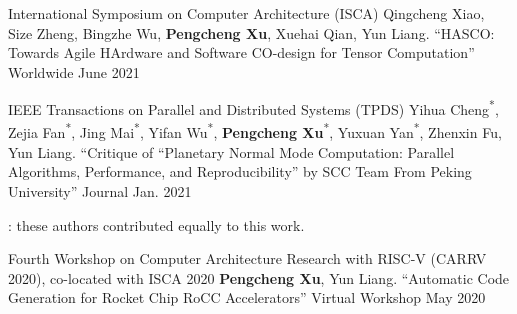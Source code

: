 


\begin{cventries}

  \cventry
    {International Symposium on Computer Architecture (ISCA)}
    {{\normalfont Qingcheng Xiao, Size Zheng, Bingzhe Wu, \textbf{Pengcheng Xu}, Xuehai Qian, Yun Liang. ``HASCO: Towards Agile HArdware and Software CO-design for Tensor Computation''}}
    {Worldwide} %
    {June 2021} %
    {}

  \cventry
    {IEEE Transactions on Parallel and Distributed Systems (TPDS)}
    {{\normalfont Yihua Cheng\textsuperscript{*}, Zejia Fan\textsuperscript{*}, Jing Mai\textsuperscript{*}, Yifan Wu\textsuperscript{*}, \textbf{Pengcheng Xu}\textsuperscript{*}, Yuxuan Yan\textsuperscript{*}, Zhenxin Fu, Yun Liang. ``Critique of “Planetary Normal Mode Computation: Parallel Algorithms, Performance, and Reproducibility” by SCC Team From Peking University''}}
    {Journal} %
    {Jan. 2021} %
    {
      \begin{cvitems} %
      \item {\footnotesize *: these authors contributed equally to this work.}
      \end{cvitems}
    }

  \cventry
    {Fourth Workshop on Computer Architecture Research with RISC-V (CARRV 2020), co-located with ISCA 2020} %
    {{\normalfont \textbf{Pengcheng Xu}, Yun Liang. ``Automatic Code Generation for Rocket Chip RoCC Accelerators''}} %
    {Virtual Workshop} %
    {May 2020} %
    {}
\end{cventries}
